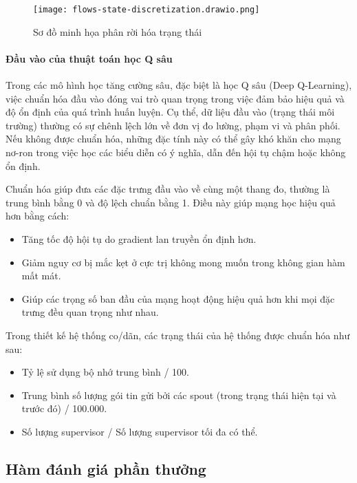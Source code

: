 \begin{figure}[H]
    \centering
    \texttt{[image: flows-state-discretization.drawio.png]}
    \caption{Sơ đồ minh họa phân rời hóa trạng thái}
    \label{fig:flows-state-discretization}
\end{figure}

\paragraph{Đầu vào của thuật toán học Q sâu}

Trong các mô hình học tăng cường sâu, đặc biệt là học Q sâu (Deep Q-Learning), việc chuẩn hóa đầu vào đóng vai trò quan trọng trong việc đảm bảo hiệu quả và độ ổn định của quá trình huấn luyện. Cụ thể, dữ liệu đầu vào (trạng thái môi trường) thường có sự chênh lệch lớn về đơn vị đo lường, phạm vi và phân phối. Nếu không được chuẩn hóa, những đặc tính này có thể gây khó khăn cho mạng nơ-ron trong việc học các biểu diễn có ý nghĩa, dẫn đến hội tụ chậm hoặc không ổn định.

Chuẩn hóa giúp đưa các đặc trưng đầu vào về cùng một thang đo, thường là trung bình bằng 0 và độ lệch chuẩn bằng 1. Điều này giúp mạng học hiệu quả hơn bằng cách:

\begin{itemize}
    \item Tăng tốc độ hội tụ do gradient lan truyền ổn định hơn.
    \item Giảm nguy cơ bị mắc kẹt ở cực trị không mong muốn trong không gian hàm mất mát.
    \item Giúp các trọng số ban đầu của mạng hoạt động hiệu quả hơn khi mọi đặc trưng đều quan trọng như nhau.
\end{itemize}

Trong thiết kế hệ thống co/dãn, các trạng thái của hệ thống được chuẩn hóa như sau:
\begin{itemize}
    \item Tỷ lệ sử dụng bộ nhớ trung bình / 100.
    \item Trung bình số lượng gói tin gửi bởi các spout (trong trạng thái hiện tại và trước đó) / 100.000.
    \item Số lượng supervisor / Số lượng supervisor tối đa có thể.
\end{itemize}

\subsection{Hàm đánh giá phần thưởng}

